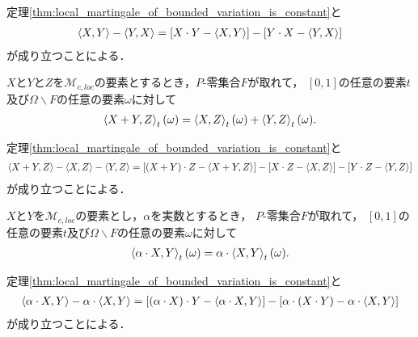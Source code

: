 	\begin{sketch}
		定理\ref{thm:local_martingale_of_bounded_variation_is_constant}と
		\begin{align}
			\inprod<X,Y> - \inprod<Y,X> = \left[X \cdot Y - \inprod<X,Y>\right] - \left[Y \cdot X - \inprod<Y,X>\right]
		\end{align}
		が成り立つことによる．
		\QED
	\end{sketch}
	
	\begin{screen}
		\begin{thm}[和の共変分]
			$X$と$Y$と$Z$を$\mathscr{M}_{c,loc}$の要素とするとき，$P$-零集合$F$が取れて，
			$[0,1]$の任意の要素$t$及び$\Omega \backslash F$の任意の要素$\omega$に対して
			\begin{align}
				\inprod<X+Y,Z>_{t}(\omega) 
				= \inprod<X,Z>_{t}(\omega) + \inprod<Y,Z>_{t}(\omega).
			\end{align}
		\end{thm}
	\end{screen}
	
	\begin{sketch}
		定理\ref{thm:local_martingale_of_bounded_variation_is_constant}と
		\begin{align}
			\inprod<X+Y,Z> - \inprod<X,Z> - \inprod<Y,Z> 
			= \left[(X+Y) \cdot Z - \inprod<X+Y,Z>\right] - \left[X \cdot Z - \inprod<X,Z>\right]
			- \left[Y \cdot Z - \inprod<Y,Z>\right]
		\end{align}
		が成り立つことによる．
		\QED
	\end{sketch}
	
	\begin{screen}
		\begin{thm}[スカラ倍の共変分]
			$X$と$Y$を$\mathscr{M}_{c,loc}$の要素とし，$\alpha$を実数とするとき，
			$P$-零集合$F$が取れて，
			$[0,1]$の任意の要素$t$及び$\Omega \backslash F$の任意の要素$\omega$に対して
			\begin{align}
				\inprod<\alpha \cdot X,Y>_{t}(\omega) = \alpha \cdot \inprod<X,Y>_{t}(\omega).
			\end{align}
		\end{thm}
	\end{screen}
	
	\begin{sketch}
		定理\ref{thm:local_martingale_of_bounded_variation_is_constant}と
		\begin{align}
			\inprod<\alpha \cdot X,Y> - \alpha \cdot \inprod<X,Y>
			= \left[(\alpha \cdot X) \cdot Y - \inprod<\alpha \cdot X,Y>\right] 
			- \left[\alpha \cdot (X \cdot Y) - \alpha \cdot \inprod<X,Y>\right]
		\end{align}
		が成り立つことによる．
		\QED
	\end{sketch}
	
